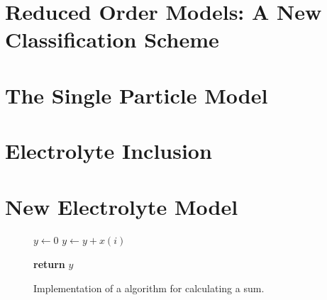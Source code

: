 



\graphicspath{{4/figures/}}


\section{Reduced Order Models: A New Classification Scheme}\label{sec:classificationscheme}


\section{The Single Particle Model}


\section{Electrolyte Inclusion}\label{sec:electrolyteinclusion}


\section{New Electrolyte Model}\label{sec:newelectrolytemodel}


\begin{figure}[htb]
    \begin{algorithmic}[1]


        \State $y\gets0$
         
        \State $y\gets y+x(i)$ 
        \EndFor

        \State \textbf{return}  $y$
        \EndProcedure
    \end{algorithmic}
    \caption[Implementation of a algorithm for calculating a sum.]{Implementation of a algorithm for calculating a sum.}
    \label{fig:algorithm1}
\end{figure}





